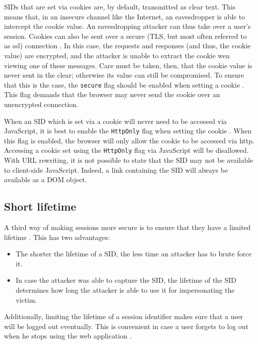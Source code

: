 \label{secure-flag}SIDs that are set via cookies are, by default, transmitted as clear text. This means that, in an insecure channel like the Internet, an eavesdropper is able to intercept the cookie value. An eavesdropping attacker can thus take over a user's session. Cookies can also be sent over a secure (TLS, but most often referred to as \gls{ssl}) connection \cite{rfc4346}. In this case, the requests and responses (and thus, the cookie value) are encrypted, and the attacker is unable to extract the cookie wen viewing one of these messages. Care must be taken, then, that the cookie value is never sent in the clear; otherwise its value can still be compromised. To ensure that this is the case, the \texttt{secure} flag should be enabled when setting a cookie \cite{Fu2001, rfc2965}. This flag demands that the browser may never send the cookie over an unencrypted connection.

When an SID which is set via a cookie will never need to be accessed via JavaScript, it is best to enable the \texttt{HttpOnly} flag when setting the cookie \cite{Nikiforakis2010}. When this flag is enabled, the browser will only allow the cookie to be accessed via \gls{http}. Accessing a cookie set using the \texttt{HttpOnly} flag via JavaScript will be disallowed. With URL rewriting, it is not possible to state that the SID may not be available to client-side JavaScript. Indeed, a link containing the SID will always be available as a DOM object.

\subsection{Short lifetime}\label{lifetime}
A third way of making sessions more secure is to ensure that they have a limited lifetime \cite{Fu2001}. This has two advantages:
\begin{itemize}
	\item The shorter the lifetime of a SID, the less time an attacker has to brute force it.
	\item In case the attacker was able to capture the SID, the lifetime of the SID determines how long the attacker is able to use it for impersonating the victim.
\end{itemize}

Additionally, limiting the lifetime of a session identifier makes sure that a user will be logged out eventually. This is convenient in case a user forgets to log out when he stops using the web application \cite{OWASP2009a}.

